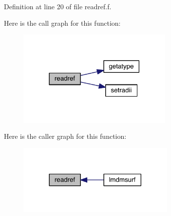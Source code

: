Definition at line 20 of file readref.\+f.



Here is the call graph for this function\+:\nopagebreak
\begin{figure}[H]
\begin{center}
\leavevmode
\includegraphics[width=218pt]{readref_8f_adfb4c471412959ed0a18a47d8fb36b22_cgraph}
\end{center}
\end{figure}




Here is the caller graph for this function\+:\nopagebreak
\begin{figure}[H]
\begin{center}
\leavevmode
\includegraphics[width=221pt]{readref_8f_adfb4c471412959ed0a18a47d8fb36b22_icgraph}
\end{center}
\end{figure}



